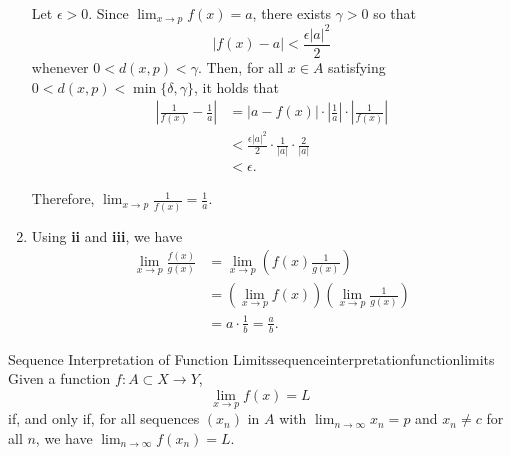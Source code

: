 \begin{dem}{}{}
\begin{enumerate}
			Let \(\epsilon > 0\). Since \(\lim_{x\to p} f(x) = a\), there exists \(\gamma > 0\) so that \[
				|f(x) - a| < \frac{\epsilon |a|^2}{2}
			\]
			whenever \(0 < d(x, p) < \gamma\).
			Then, for all \(x \in A\) satisfying \(0 < d(x, p) < \min\{\delta, \gamma\}\), it holds that
			\begin{align*}
				\left|\frac{1}{f(x)} - \frac{1}{a}\right| &= |a - f(x)|\cdot \left|\frac{1}{a}\right| \cdot \left|\frac{1}{f(x)}\right|\\
				&< \frac{\epsilon |a|^2}{2} \cdot \frac{1}{|a|} \cdot \frac{2}{|a|} \\
				&< \epsilon.
			\end{align*}

			Therefore, \(\lim_{x\to p} \frac{1}{f(x)} = \frac{1}{a}\).
		\item Using \textbf{ii} and \textbf{iii}, we have 
			\begin{align*}
				\lim_{x\to p} \frac{f(x)}{g(x)} &= \lim_{x\to p} \left( f(x) \frac{1}{g(x)} \right) \\
												  &= \left(\lim_{x\to p} f(x)\right) \left(\lim_{x\to p}\frac{1}{g(x)} \right) \\
												  &= a\cdot \frac{1}{b} = \frac{a}{b}. 
			\end{align*}
	\end{enumerate}
\end{dem}

\begin{thm}{Sequence Interpretation of Function Limits}{sequenceinterpretationfunctionlimits}
	Given a function \(f \colon A \subset X \to Y\),
	\[
		\lim_{x \to p} f(x) = L
	\] if, and only if, for all sequences \((x_n)\) in \(A\) with \(\lim_{n\to \infty}x_n = p\) and \(x_n \neq c\) for all \(n\), we have \(\lim_{n\to\infty}f(x_n) = L\).
\end{thm}

